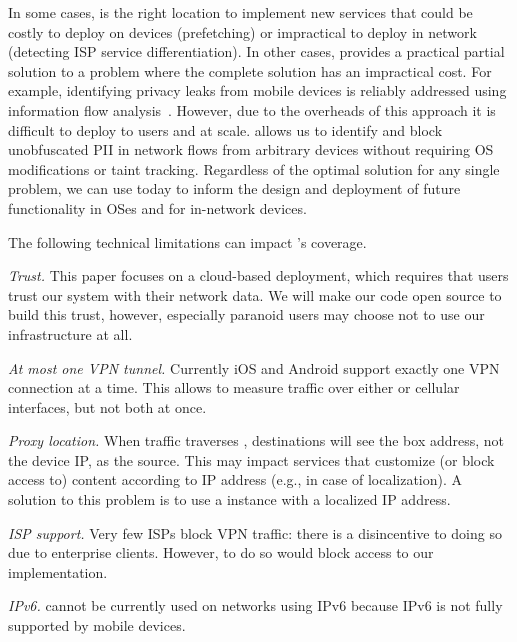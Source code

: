 In some cases, \meddle is the right location to implement new services that could be costly 
to deploy on devices (prefetching) or impractical to deploy in network (detecting ISP service differentiation). 
In other cases, \meddle provides a practical partial solution to a problem where the complete solution has an impractical 
cost. For example, identifying privacy leaks from mobile devices is reliably addressed using information flow 
analysis~\cite{enck:taintdroid}. However, due to the overheads of this approach it is difficult to deploy to users 
and at scale. \meddle allows us to identify and block unobfuscated PII in network flows from arbitrary devices without requiring 
OS modifications or taint tracking. Regardless of the optimal solution for any single problem, we can use \meddle today to inform the design 
and deployment of future functionality in OSes and for in-network devices. 

 The following technical limitations can impact \meddle's coverage.

\noindent\emph{Trust.} This paper focuses on a cloud-based \meddle deployment, which requires 
that users trust our system with their network data. We will make our code open source to build this 
trust, however, especially paranoid users may choose not to use our infrastructure at all.

\noindent\emph{At most one VPN tunnel.}
Currently iOS and Android support exactly one VPN connection at a time. 
This allows \meddle to measure traffic over either \wifi or cellular interfaces, but not both at once.

\noindent\emph{Proxy location.} 
When traffic traverses \meddle, destinations will see the \meddle box address, not the device IP, as the source. 
This may impact services  that customize (or block access to) content according to IP address (e.g., in case of localization). 
A solution to this problem is to use a \meddle{} instance with a localized IP address.

\noindent\emph{ISP support.}
Very few ISPs block VPN traffic: there is a disincentive to doing so due to enterprise clients. However, to do so would block access to our \meddle implementation. 

\noindent\emph{IPv6.}
\meddle{} cannot be currently used on networks using IPv6 because IPv6 is not fully supported by mobile devices. 



